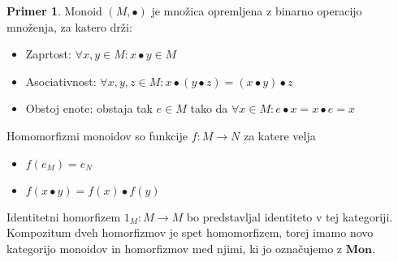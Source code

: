 \documentclass[12pt,a4paper]{book}
\theoremstyle{definition}
\theoremstyle{plain}
\theoremstyle{definition}
\newtheorem{primer}{Primer}[section]
\theoremstyle{remark}
\newcommand{\cat}[1]{\textbf{#1}}
\begin{document}
\begin{primer}
Monoid $(M, \bullet)$ je množica opremljena z binarno operacijo množenja, za katero drži:
\begin{itemize}
\item Zaprtost: $\forall x,y \in M : x \bullet y \in M$
\item Asociativnost: $\forall x,y,z \in M : x \bullet ( y \bullet z ) = ( x \bullet y ) \bullet z$
\item Obstoj enote: obstaja tak $e \in M$ tako da $\forall x \in M : e \bullet x = x \bullet e = x$
\end{itemize}
Homomorfizmi monoidov so funkcije $f : M \to N$ za katere velja
\begin{itemize}
\item $f(e_M) = e_N$
\item $f(x \bullet y) = f(x) \bullet f(y)$
\end{itemize}
Identitetni homorfizem $1_M : M \to M$ bo predstavljal identiteto v tej kategoriji. Kompozitum dveh homorfizmov je spet homomorfizem, torej imamo novo kategorijo monoidov in homorfizmov med njimi, ki jo označujemo z $\cat{Mon}$.
\end{primer}
\end{document}
